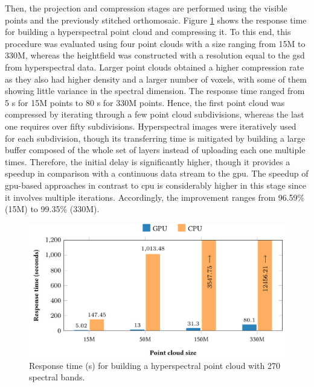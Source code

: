 Then, the projection and compression stages are performed using the visible points and the previously stitched orthomosaic. Figure \ref{fig:hyper_compression_results} shows the response time for building a hyperspectral point cloud and compressing it. To this end, this procedure was evaluated using four point clouds with a size ranging from 15M to 330M, whereas the heightfield was constructed with a resolution equal to the \acrshort{gsd} from hyperspectral data. Larger point clouds obtained a higher compression rate as they also had higher density and a larger number of voxels, with some of them showing little variance in the spectral dimension. The response time ranged from 5 \si{\second} for 15M points to 80 \si{\second} for 330M points. Hence, the first point cloud was compressed by iterating through a few point cloud subdivisions, whereas the last one requires over fifty subdivisions. Hyperspectral images were iteratively used for each subdivision, though its transferring time is mitigated by building a large buffer composed of the whole set of layers instead of uploading each one multiple times. Therefore, the initial delay is significantly higher, though it provides a speedup in comparison with a continuous data stream to the \acrshort{gpu}. The speedup of \acrshort{gpu}-based approaches in contrast to \acrshort{cpu} is considerably higher in this stage since it involves multiple iterations. Accordingly, the improvement ranges from 96.59\% (15M) to 99.35\% (330M).

\begin{figure}[bt]
    \centering
    \includegraphics[width=\linewidth]{figs/hyper_point_cloud/compression_results.png}
	\caption{Response time (\si{\second}) for building a hyperspectral point cloud with 270 spectral bands. }
	\label{fig:hyper_compression_results}
\end{figure}

